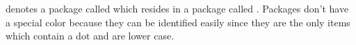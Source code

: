  denotes a package called  which resides in a package called . Packages don't have a special color because they can be identified easily since they are the only items which contain a dot and are lower case.




